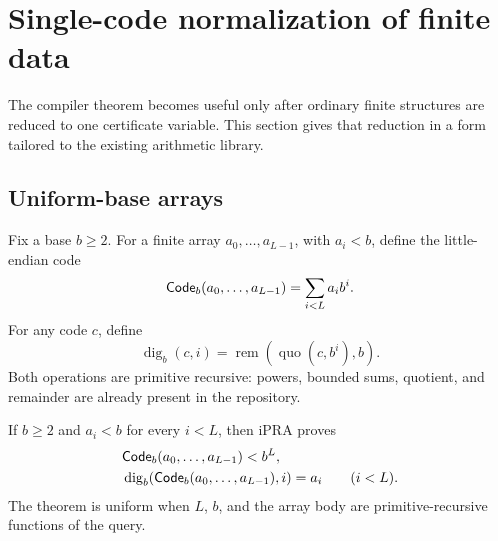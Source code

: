 \section{Single-code normalization of finite data}

The compiler theorem becomes useful only after ordinary finite structures are
reduced to one certificate variable.  This section gives that reduction in a
form tailored to the existing arithmetic library.

\subsection{Uniform-base arrays}

Fix a base \(b\ge2\).  For a finite array
\(a_0,\ldots,a_{L-1}\), with \(a_i<b\), define the little-endian code
\[
  \mathsf{Code}_b(a_0,\ldots,a_{L-1})
    =\sum_{i<L} a_i b^i.
\]
For any code \(c\), define
\[
  \operatorname{dig}_b(c,i)
    = \operatorname{rem}\!
       \left(\operatorname{quo}(c,b^i),b\right).
\]
Both operations are primitive recursive: powers, bounded sums, quotient, and
remainder are already present in the repository.

\begin{theorem}\label{thm:uniform-code}
If \(b\ge2\) and \(a_i<b\) for every \(i<L\), then iPRA proves
\begin{align*}
  &\mathsf{Code}_b(a_0,\ldots,a_{L-1})<b^L,\\
  &\operatorname{dig}_b(\mathsf{Code}_b(a_0,\ldots,a_{L-1}),i)=a_i
    \qquad(i<L).
\end{align*}
The theorem is uniform when \(L\), \(b\), and the array body are
primitive-recursive functions of the query.
\end{theorem}


